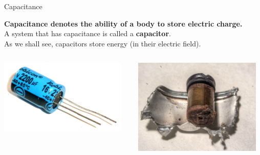 \begin{frame}{Capacitance}

{\bf Capacitance denotes the ability of a body to store electric charge.}\\
\vspace{0.4cm}
A system that has capacitance is called a {\bf capacitor}.\\
\vspace{0.2cm}
As we shall see, capacitors store energy (in their electric field).\\
\begin{columns}
  \begin{column}{0.50\textwidth}
   \begin{center}
     \includegraphics[width=0.95\textwidth]{./images/photos/capacitor_1.jpg}\\
   \end{center}
  \end{column}
  \begin{column}{0.50\textwidth}
   \begin{center}
     \includegraphics[width=0.95\textwidth]{./images/photos/capacitor_interior_1.jpg}\\
   \end{center}
  \end{column}
\end{columns}

\end{frame}


